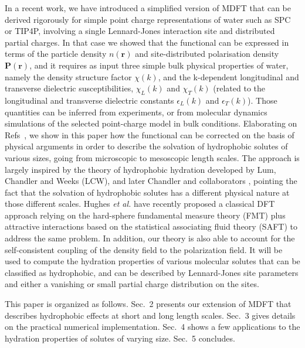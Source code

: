 \documentclass[aip,jcp,preprint]{revtex4-1}
\newcommand{\rr}{\mathbf{r}}
\newcommand{\PP}{\mathbf{P}}
\begin{document}
In a recent work\cite{jeanmairet13}, we have introduced a simplified version of MDFT that can be derived rigorously for simple point charge representations of water such as SPC or TIP4P, involving a  single Lennard-Jones interaction site and distributed partial charges. In that case we showed that the functional can be expressed in terms of the particle density $n(\rr)$ and site-distributed polarisation density $\PP(\rr)$, and it requires  as input three simple bulk physical properties of water, namely the density structure factor $\chi(k)$, and the k-dependent longitudinal and transverse dielectric susceptibilities, $\chi_L(k)$ and $\chi_T(k)$ (related to the longitudinal and transverse dielectric constants $\epsilon_L(k)$ and $\epsilon_T(k)$\cite{raineri92,raineri93,bopp98}). Those quantities can be inferred from experiments, or from molecular dynamics simulations of the selected point-charge model in bulk conditions\cite{bopp96,bopp98}. Elaborating on Refs~\cite{levesque12_1,jeanmairet13}, we  show in this paper how the  functional can be corrected on the basis of physical arguments  in order to describe the solvation of hydrophobic solutes of various sizes, going from microscopic to mesoscopic length scales. The approach is largely inspired by the theory of hydrophobic hydration developed by Lum, Chandler and Weeks (LCW)\cite{lum99}, and later Chandler and collaborators
\cite{tenwolde01,tenwolde02,huang02,varilly11,chandler-varilly11}, pointing the fact that the solvation of hydrophobic solutes has a different physical nature at those different  scales.  Hughes {\em et al.} have recently proposed a classical DFT approach relying on the hard-sphere fundamental measure theory (FMT) plus attractive interactions based on the
statistical associating fluid theory  (SAFT)  to address the same problem.\cite{roundy13} In addition,  our theory is also able to account for the self-consistent coupling of the density field to the  polarization field. It will be used to compute the hydration properties of various molecular solutes that can be classified as hydrophobic, and can be described by  Lennard-Jones site parameters and  either a vanishing or small partial charge distribution on the sites.

This paper is organized as follows. Sec.~2 presents our extension of MDFT that describes  hydrophobic effects at short and long length scales. Sec.~3  gives details on the practical numerical implementation. Sec.~4 shows a few applications to the hydration properties of solutes of varying size. Sec.~5 concludes.
\end{document}
